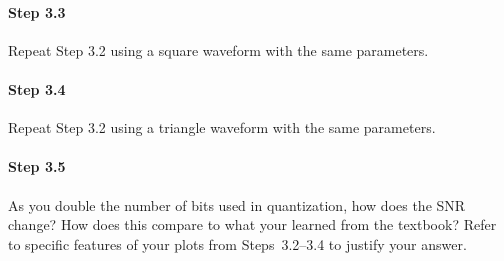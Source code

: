   \paragraph{Step 3.3} Repeat Step 3.2 using a square waveform with
  the same parameters.

  \paragraph{Step 3.4} Repeat Step 3.2 using a triangle waveform with
  the same parameters.

  \paragraph{Step 3.5} As you double the number of bits used in
  quantization, how does the SNR change? How does this compare to what
  your learned from the textbook? Refer to specific features of your
  plots from Steps~3.2--3.4 to justify your answer.
